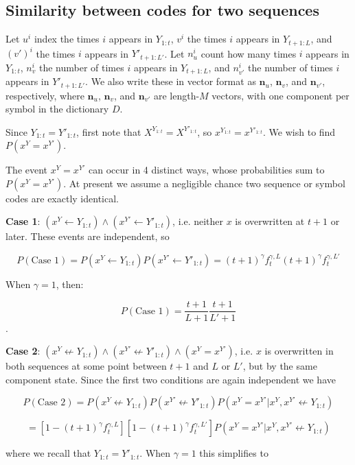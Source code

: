 \documentclass{article}
\begin{document}
\begin{appendices}
\subsection{Similarity between codes for two sequences}

Let $u^i$ index the times $i$ appears in $Y_{1:t}$, $v^i$ the times $i$ appears in $Y_{t+1:L}$, and $(v')^i$ the times $i$ appears in $Y'_{t+1:L'}$. Let $n^i_u$ count how many times $i$ appears in $Y_{1:t}$, $n^i_v$ the number of times $i$ appears in $Y_{t+1:L}$, and $n^i_{v'}$ the number of times $i$ appears in $Y'_{t+1:L'}$. We also write these in vector format as $\mathbf{n}_u$, $\mathbf{n}_v$, and $\mathbf{n}_{v'}$, respectively, where $\mathbf{n}_u$, $\mathbf{n}_v$, and $\mathbf{n}_{v'}$ are length-$M$ vectors, with one component per symbol in the dictionary $D$.

Since $Y_{1:t} = Y'_{1:t}$,  first note that $X^{Y_{1:t}} = X^{Y'_{1:t}}$, so $x^{Y_{1:t}} = x^{Y'_{1:t}}$. We wish to find $P(x^Y = x^{Y'})$.

The event $x^Y = x^{Y'}$ can occur in 4 distinct ways, whose probabilities sum to $P(x^Y = x^{Y'})$. At present we assume a negligible chance two sequence or symbol codes are exactly identical.

\textbf{Case 1}: $(x^Y \leftarrow Y_{1:t}) \land (x^{Y'} \leftarrow Y'_{1:t})$, i.e. neither $x$ is overwritten at $t+1$ or later. These events are independent, so

$$P(\textrm{Case 1}) = P(x^Y \leftarrow Y_{1:t})P(x^{Y'} \leftarrow Y'_{1:t}) = (t+1)^\gamma f^{\gamma,L}_t(t+1)^\gamma f^{\gamma,L'}_t$$

When $\gamma = 1$, then:

$$P(\textrm{Case 1}) = \frac{t+1}{L+1}\frac{t+1}{L'+1}$$.

\textbf{Case 2}: $(x^Y \not\leftarrow Y_{1:t}) \land (x^{Y'} \not\leftarrow Y'_{1:t}) \land (x^Y = x^{Y'})$, i.e. $x$ is overwritten in both sequences at some point between $t+1$ and $L$ or $L'$, but by the same component state. Since the first two conditions are again independent we have

$$P(\textrm{Case 2}) = P(x^Y \not\leftarrow Y_{1:t})P(x^{Y'} \not\leftarrow Y'_{1:t})P(x^Y = x^{Y'}|x^Y, x^{Y'} \not\leftarrow Y_{1:t})$$

$$= [1 - (t+1)^\gamma f^{\gamma,L}_t][1 - (t+1)^\gamma f^{\gamma,L'}_t]P(x^Y = x^{Y'}|x^Y, x^{Y'} \not\leftarrow Y_{1:t})$$

where we recall that $Y_{1:t} = Y'_{1:t}$. When $\gamma = 1$ this simplifies to


\end{appendices}
\end{document}
